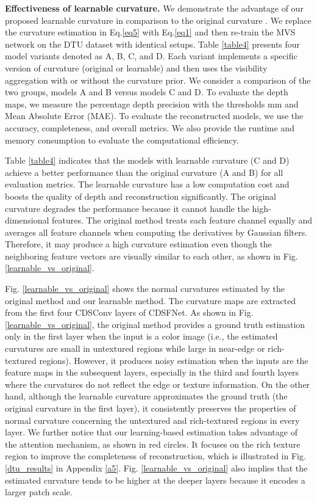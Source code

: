 \documentclass{article} \usepackage{iclr2022_conference,times}
\begin{document}
\textbf{Effectiveness of learnable curvature.} We demonstrate the advantage of our proposed learnable curvature in comparison to the original curvature \citep{xu2020marmvs}. We replace the curvature estimation in Eq.\ref{eq5} with Eq.\ref{eq1} and then re-train the MVS network on the DTU dataset with identical setups. Table \ref{table4} presents four model variants denoted as A, B, C, and D. Each variant implements a specific version of curvature (original or learnable) and then uses the visibility aggregation with or without the curvature prior. We consider a comparison of the two groups, models A and B versus models C and D. To evaluate the depth maps, we measure the percentage depth precision with the thresholds mm and Mean Absolute Error (MAE). To evaluate the reconstructed models, we use the accuracy, completeness, and overall metrics. We also provide the runtime and memory consumption to evaluate the computational efficiency. 

Table \ref{table4} indicates that the models with learnable curvature (C and D) achieve a better performance than the original curvature (A and B) for all evaluation metrics. The learnable curvature has a low computation cost and boosts the quality of depth and reconstruction significantly. The original curvature degrades the performance because it cannot handle the high-dimensional features. The original method treats each feature channel equally and averages all feature channels when computing the derivatives by Gaussian filters. Therefore, it may produce a high curvature estimation even though the neighboring feature vectors are visually similar to each other, as shown in Fig. \ref{learnable_vs_original}. 

Fig. \ref{learnable_vs_original} shows the normal curvatures estimated by the original method \citep{xu2020marmvs} and our learnable method. The curvature maps are extracted from the first four CDSConv layers of CDSFNet. As shown in Fig. \ref{learnable_vs_original}, the original method provides a ground truth estimation only in the first layer when the input is a color image (i.e., the estimated curvatures are small in untextured regions while large in near-edge or rich-textured regions). However, it produces noisy estimation when the inputs are the feature maps in the subsequent layers, especially in the third and fourth layers where the curvatures do not reflect the edge or texture information. On the other hand, although the learnable curvature approximates the ground truth (the original curvature in the first layer), it consistently preserves the properties of normal curvature concerning the untextured and rich-textured regions in every layer. We further notice that our learning-based estimation takes advantage of the attention mechanism, as shown in red circles. It focuses on the rich texture region to improve the completeness of reconstruction, which is illustrated in Fig. \ref{dtu_results} in Appendix \ref{a5}. Fig. \ref{learnable_vs_original} also implies that the estimated curvature tends to be higher at the deeper layers because it encodes a larger patch scale.   
\end{document}
